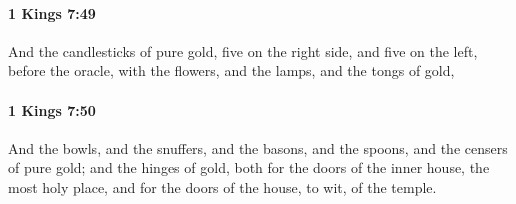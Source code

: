 		\paragraph{1 Kings 7:49} %
			\label{1KINGS-7-49}

			And the candlesticks of pure gold, five on the right side, and five on the left, before the oracle, with the flowers, and the lamps, and the tongs of gold,


		\paragraph{1 Kings 7:50} %
			\label{1KINGS-7-50}

			And the bowls, and the snuffers, and the basons, and the spoons, and the censers of pure gold; and the hinges of gold, both for the doors of the inner house, the most holy place, and for the doors of the house, to wit, of the temple.

